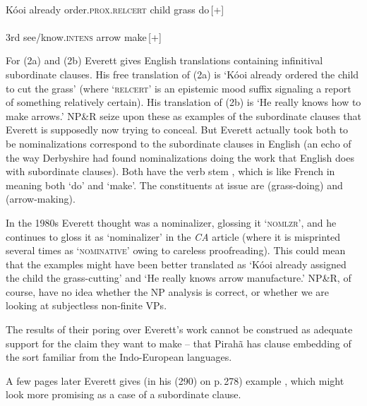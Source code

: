 \documentclass[output=paper,colorlinks,citecolor=brown
]{langscibook}
\begin{document}
\ea \ea \gll {} 
          
           \\
        K{\'o}{\textglotstop}oi already order.\textsc{prox}.\textsc{relcert} 
           child grass do\,[+]\\
    \ex \gll {}  
               \\
             3rd  see/know.\textsc{intens}  arrow make\,[+]\\
   \z
\z

\noindent
For (2a) and (2b) Everett gives English translations containing
infinitival subordinate clauses. His free translation of (2a) is
`K{\'o}{\textglotstop}oi already ordered the child to cut the grass'
(where `\textsc{relcert}' is an epistemic mood suffix signaling a
report of something relatively certain). His translation of (2b)
is `He really knows how to make arrows.' NP\&R seize upon these as
examples of the subordinate clauses that Everett is supposedly
now trying to conceal. But Everett actually took both to be
nominalizations correspond to the subordinate clauses in English
(an echo of the way Derbyshire had found nominalizations doing the
work that English does with subordinate clauses). Both have the
verb stem , which is like French  in meaning
both `do' and `make'. The constituents at issue are 
(grass-doing) and  (arrow-making).

In the 1980s Everett thought \mbox{} was a nominalizer,
glossing it `\textsc{nomlzr}', and he continues to gloss it as
`nominalizer' in the \textit{CA} article (where it is misprinted
several times as `\textsc{nominative}' owing to careless proofreading).
This could mean that the examples might have been better translated
as `K{\'o}{\textglotstop}oi already assigned the child the grass-cutting'
and `He really knows arrow manufacture.' NP\&R, of course, have no idea
whether the NP analysis is correct, or whether we are looking at
subjectless non-finite VPs.

The results of their poring over Everett's work cannot be construed as
adequate support for the claim they want to make -- that Pirah{\~a}
has clause embedding of the sort familiar from the Indo-European
languages.

A few pages later Everett gives (in his (290) on p.\,278) example ,
which might look more promising as a case of a subordinate clause.
\end{document}
